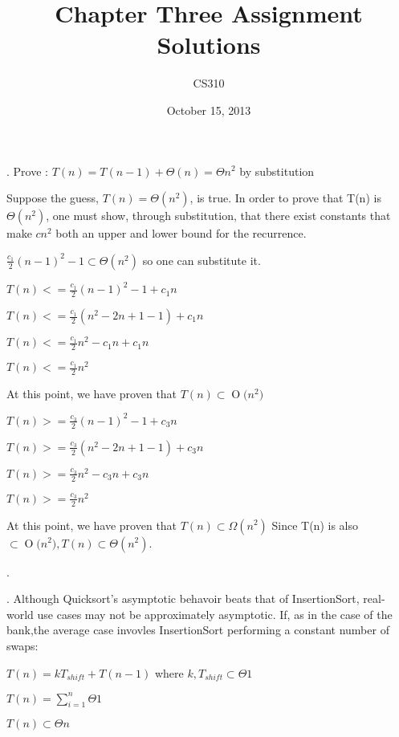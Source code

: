 \documentclass[12pt]{article}
\newcommand{\BigO}[1]{\ensuremath{\operatorname{O}\bigl(#1\bigr)}}
\begin{document}
\title{Chapter Three Assignment Solutions}
\author{CS310}
\date{October 15, 2013}
\maketitle
{}
\setcounter{problem}{1}
\noindent {}.
Prove : $T(n) = T(n-1) + \Theta(n) = \Theta{n^2}$ by substitution

Suppose the guess, $T(n) = \Theta(n^2) $, is true. In order to prove that T(n) is $\Theta(n^2)$, one must show, through substitution, that there exist constants 
that make $c n^2$ both an upper and lower bound for the recurrence.

$ \frac{c_{1}}{2} (n-1)^2 - 1 \subset \Theta(n^2) $ so one can substitute it.

$T(n) <= \frac{c_{1}}{2} (n-1)^2 - 1 +  c_{1} n$

$T(n) <= \frac{c_{1}}{2} (n^2 - 2n + 1 - 1) + c_{1} n $

$T(n) <= \frac{c_{1}}{2} n^2 - c_{1} n + c_{1} n $

$T(n) <= \frac{c_{1}}{2} n^2   $

At this point, we have proven that $T(n) \subset \BigO{n^2}$

$T(n) >= \frac{c_{3}}{2} (n-1)^2 - 1 +  c_{3} n$

$T(n) >= \frac{c_{3}}{2} (n^2 - 2n + 1 - 1) + c_{3} n $

$T(n) >= \frac{c_{3}}{2} n^2 - c_{3} n + c_{3} n $

$T(n) >= \frac{c_{3}}{2} n^2   $

At this point, we have proven that $T(n) \subset \Omega(n^2) $ Since T(n) is also
$\subset \BigO{n^2}, T(n) \subset \Theta(n^2)$.

\vspace{10mm}
\noindent {}.

\vspace{10mm}
\noindent {}.
Although Quicksort's asymptotic behavoir beats that of InsertionSort, real-world use cases may not be approximately asymptotic. If, as in the case of the bank,the average case invovles InsertionSort performing a constant number of swaps:

$T(n) = kT_{shift} + T(n-1)$    where  $k,T_{shift} \subset \Theta{1}$

$T(n) = \displaystyle\sum\limits_{i=1}^{n} \Theta{1}$

$T(n) \subset \Theta{n}$
\end{document}
